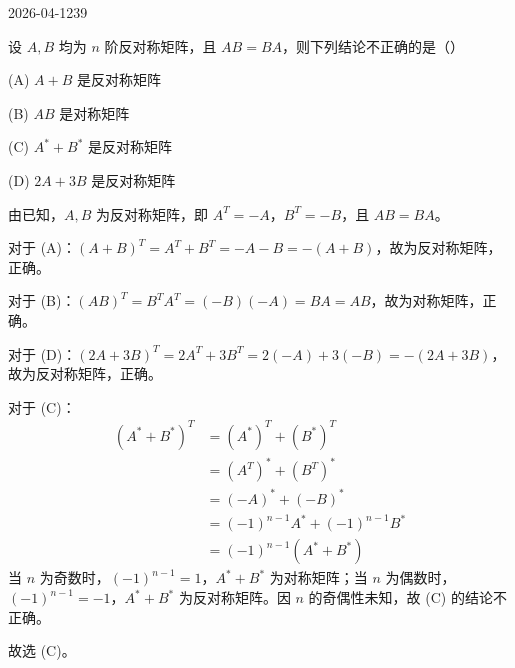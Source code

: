 \begin{mistake}{2026-04-12}{39}

\begin{problemcontent}
设 \(A,B\) 均为 \(n\) 阶反对称矩阵，且 \(AB = BA\)，则下列结论不正确的是（\quad）

(A) \(A+B\) 是反对称矩阵

(B) \(AB\) 是对称矩阵

(C) \(A^*+B^*\) 是反对称矩阵

(D) \(2A+3B\) 是反对称矩阵
\end{problemcontent}

\begin{solutioncontent}
由已知，\(A, B\) 为反对称矩阵，即 \(A^T = -A\)，\(B^T = -B\)，且 \(AB = BA\)。

对于 (A)：\((A+B)^T = A^T + B^T = -A - B = -(A+B)\)，故为反对称矩阵，正确。

对于 (B)：\((AB)^T = B^T A^T = (-B)(-A) = BA = AB\)，故为对称矩阵，正确。

对于 (D)：\((2A+3B)^T = 2A^T + 3B^T = 2(-A) + 3(-B) = -(2A+3B)\)，故为反对称矩阵，正确。

对于 (C)：
\[
\begin{aligned}
(A^*+B^*)^T &= (A^*)^T + (B^*)^T \\
&= (A^T)^* + (B^T)^* \\
&= (-A)^* + (-B)^* \\
&= (-1)^{n-1}A^* + (-1)^{n-1}B^* \\
&= (-1)^{n-1}(A^*+B^*)
\end{aligned}
\]
当 \(n\) 为奇数时，\((-1)^{n-1}=1\)，\(A^*+B^*\) 为对称矩阵；当 \(n\) 为偶数时，\((-1)^{n-1}=-1\)，\(A^*+B^*\) 为反对称矩阵。因 \(n\) 的奇偶性未知，故 (C) 的结论不正确。

故选 (C)。
\end{solutioncontent}


\end{mistake}
